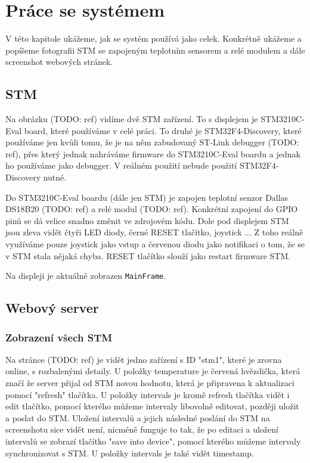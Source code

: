 
\section{Práce se systémem}
V této kapitole ukážeme, jak se systém používá jako celek.
Konkrétně ukážeme a popíšeme fotografii STM se zapojeným teplotním sensorem a relé modulem a dále
screenshot webových stránek.

\subsection{STM}


Na obrázku (TODO: ref) vidíme dvě STM zařízení.
To s displejem je STM3210C-Eval board, které používáme v celé práci.
To druhé je STM32F4-Discovery, které používáme jen kvůli tomu, že je na něm zabudovaný ST-Link
debugger (TODO: ref), přes který jednak nahráváme firmware do STM3210C-Eval boardu a jednak
ho používáme jako debugger.
V reálném použití nebude použití STM32F4-Discovery nutné.

Do STM3210C-Eval boardu (dále jen STM) je zapojen teplotní senzor Dallas DS18B20 (TODO: ref)
a relé modul (TODO: ref).
Konkrétní zapojení do GPIO pinů se dá velice snadno změnit ve zdrojovém kódu.
Dole pod displejem STM jsou zleva vidět čtyři LED diody, černé RESET tlačítko, joystick ...
Z toho reálně využíváme pouze joystick jako vstup a červenou diodu jako notifikaci o tom, že
se v STM stala nějaká chyba.
RESET tlačítko slouží jako restart firmware STM.

Na displeji je aktuálně zobrazen \texttt{MainFrame}.


\subsection{Webový server}

\subsubsection{Zobrazení všech STM}


Na stránce (TODO: ref) je vidět jedno zařízení s ID "stm1", které je zrovna online, s rozbalenými
detaily.
U položky temperature je červená hvězdička, která značí že server přijal od STM novou hodnotu, která
je připravena k aktualizaci pomocí "refresh" tlačítka.
U položky intervals je kromě refresh tlačítka vidět i edit tlačítko, pomocí kterého můžeme intervaly
libovolně editovat, později uložit a poslat do STM.
Uložení intervalů a jejich následné poslání do STM na screenshotu sice vidět není, nicméně funguje to
tak, že po editaci a uložení intervalů se zobrazí tlačítko "save into device", pomocí kterého můžeme
intervaly synchronizovat s STM.
U položky intervals je také vidět timestamp.

